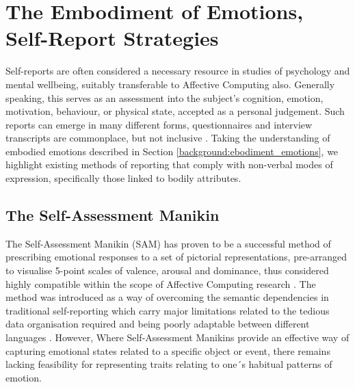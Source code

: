 



\section{The Embodiment of Emotions, Self-Report Strategies}

Self-reports are often considered a necessary resource in studies of psychology and mental wellbeing, suitably transferable to Affective Computing also. Generally speaking, this serves as an assessment into the subject's cognition, emotion, motivation, behaviour, or physical state, accepted as a personal judgement. Such reports can emerge in many different forms, questionnaires and interview transcripts are commonplace, but not inclusive \cite{barker_self-report_2016}. Taking the understanding of embodied emotions described in Section \ref{background:ebodiment_emotions}, we highlight existing methods of reporting that comply with non-verbal modes of expression, specifically those linked to bodily attributes.

\subsection{The Self-Assessment Manikin}

The Self-Assessment Manikin (SAM) has proven to be a successful method of prescribing emotional responses to a set of pictorial representations, pre-arranged to visualise 5-point scales of valence, arousal and dominance, thus considered highly compatible within the scope of Affective Computing research \cite{zeigler-hill_self-assessment_2017}. The method was introduced as a way of overcoming the semantic dependencies in traditional self-reporting which carry major limitations related to the tedious data organisation required and being poorly adaptable between different languages \cite{zeigler-hill_self-assessment_2017}. However, Where Self-Assessment Manikins provide an effective way of capturing emotional states related to a specific object or event, there remains lacking feasibility for representing traits relating to one´s habitual patterns of emotion.

